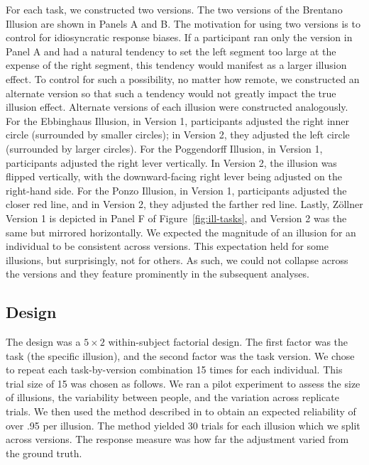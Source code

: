 For each task, we constructed two versions. The two versions of the Brentano Illusion are shown in Panels A and B. The motivation for using two versions is to control for idiosyncratic response biases. If a participant ran only the version in Panel A and had a natural tendency to set the left segment too large at the expense of the right segment, this tendency would manifest as a larger illusion effect. To control for such a possibility, no matter how remote, we constructed an alternate version so that such a tendency would not greatly impact the true illusion effect. Alternate versions of each illusion were constructed analogously. For the Ebbinghaus Illusion, in Version 1, participants adjusted the right inner circle (surrounded by smaller circles); in Version 2, they adjusted the left circle (surrounded by larger circles). For the Poggendorff Illusion, in Version 1, participants adjusted the right lever vertically. In Version 2, the illusion was flipped vertically, with the downward-facing right lever being adjusted on the right-hand side. For the Ponzo Illusion, in Version 1, participants adjusted the closer red line, and in Version 2, they adjusted the farther red line. Lastly, Zöllner Version 1 is depicted in Panel F of Figure~\ref{fig:ill-tasks}, and Version 2 was the same but mirrored horizontally. We expected the magnitude of an illusion for an individual to be consistent across versions. This expectation held for some illusions, but surprisingly, not for others. As such, we could not collapse across the versions and they feature prominently in the subsequent analyses.


\subsection*{Design}

The design was a $5 \times 2$ within-subject factorial design. The first factor was the task (the specific illusion), and the second factor was the task version.  We chose to repeat each task-by-version combination 15 times for each individual.  This trial size of 15 was chosen as follows.  We ran a pilot experiment to assess the size of illusions, the variability between people, and the variation across replicate trials.  We then used the method described in \textcite{Rouder.Mehrvarz.2024} to obtain an expected reliability of over .95 per illusion.  The method yielded 30 trials for each illusion which we split across versions.  The response measure was how far the adjustment varied from the ground truth.

